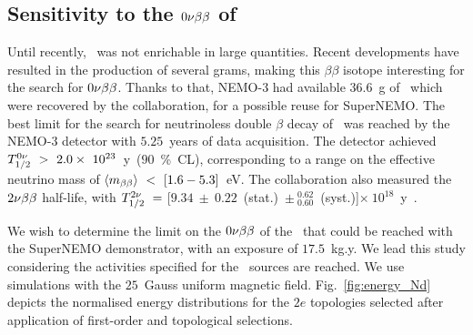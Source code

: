 \subsection{Sensitivity to the $0\nu\beta\beta$ of \Nd}

Until recently, \Nd\ was not enrichable in large quantities.
Recent developments have resulted in the production of several grams, making this $\beta\beta$ isotope interesting for the search for $0\nu\beta\beta$.
Thanks to that, NEMO-$3$ had available $36.6$~g of \Nd\ which were recovered by the collaboration, for a possible reuse for SuperNEMO.
The best limit for the search for neutrinoless double $\beta$ decay of \Nd\ was reached by the NEMO-$3$ detector with $5.25$~years of data acquisition.
The detector achieved $T_{1/2}^{0\nu}~>~2.0\times~10^{23}$~y~($90$~\%~CL), corresponding to a range on the effective neutrino mass of $\langle m_{\beta\beta}\rangle~<~[1.6-5.3]$~eV.
The collaboration also measured the $2\nu\beta\beta$ half-life, with $T_{1/2}^{2\nu}~=~$[$9.34~\pm~0.22$~(stat.)~$\pm~^{0.62}_{0.60}$~(syst.)]$\times~10^{18}$~y~\cite{art:NEMO3_Nd}.

We wish to determine the limit on the $0\nu\beta\beta$ of the \Nd\ that could be reached with the SuperNEMO demonstrator, with an exposure of $17.5$~kg.y.
We lead this study considering the activities specified for the \Se\ sources are reached.
We use simulations with the $25$~Gauss uniform magnetic field.
Fig.~\ref{fig:energy_Nd} depicts the normalised energy distributions for the $2e$ topologies selected after application of first-order and topological selections.


